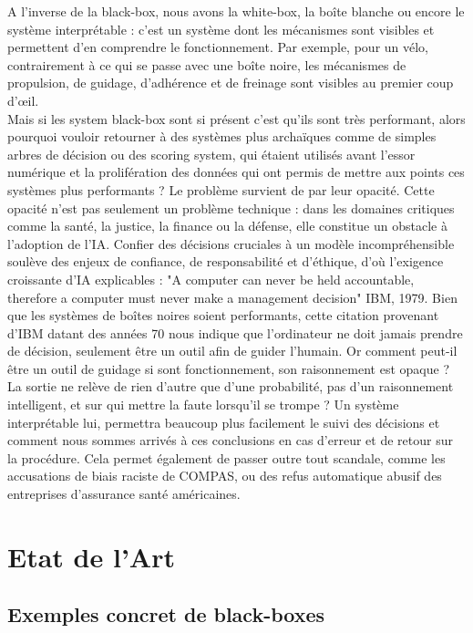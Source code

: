 \documentclass{article}
\begin{document}
A l’inverse de la black-box, nous avons la white-box, la boîte blanche ou encore le système interprétable : c’est un système dont les mécanismes sont visibles et permettent d'en comprendre le fonctionnement. Par exemple, pour un vélo, contrairement à ce qui se passe avec une boîte noire, les mécanismes de propulsion, de guidage, d'adhérence et de freinage sont visibles au premier coup d'œil.\\

Mais si les system black-box sont si présent c’est qu’ils sont très performant, alors pourquoi vouloir retourner à des systèmes plus archaïques comme de simples arbres de décision ou des scoring system, qui étaient utilisés avant l'essor numérique et la prolifération des données qui ont permis de mettre aux points ces systèmes plus performants ? Le problème survient de par leur opacité. Cette opacité n’est pas seulement un problème technique : dans les domaines critiques comme la santé, la justice, la finance ou la défense, elle constitue un obstacle à l’adoption de l’IA. Confier des décisions cruciales à un modèle incompréhensible soulève des enjeux de confiance, de responsabilité et d’éthique, d’où l’exigence croissante d’IA explicables : "A computer can never be held accountable, therefore a computer must never make a management decision" IBM, 1979. Bien que les systèmes de boîtes noires soient performants, cette citation provenant d’IBM datant des années 70 nous indique que l’ordinateur ne doit jamais prendre de décision, seulement être un outil afin de guider l’humain. Or comment peut-il être un outil de guidage si sont fonctionnement, son raisonnement est opaque ? La sortie ne relève de rien d’autre que d’une probabilité, pas d’un raisonnement intelligent, et sur qui mettre la faute lorsqu’il se trompe ? Un système interprétable lui, permettra beaucoup plus facilement le suivi des décisions et comment nous sommes arrivés à ces conclusions en cas d’erreur et de retour sur la procédure. Cela permet également de passer outre tout scandale, comme les accusations de biais raciste de COMPAS, ou des refus automatique abusif des entreprises d’assurance santé américaines.

\clearpage

\section{Etat de l'Art}

\subsection{Exemples concret de black-boxes}
\end{document}
